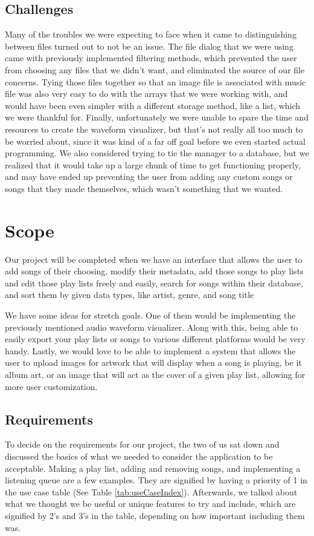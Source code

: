\documentclass[10pt,conference,onecolumn,compsoc]{IEEEtran}
\begin{document}
\subsection{Challenges}
Many of the troubles we were expecting to face when it came to distinguishing between files turned out to not be an issue. The file dialog that we were using came with previously implemented filtering methods, which prevented the user from choosing any files that we didn't want, and eliminated the source of our file concerns. Tying those files together so that an image file is associated with music file was also very easy to do with the arrays that we were working with, and would have been even simpler with a different storage method, like a list, which we were thankful for. Finally, unfortunately we were unable to spare the time and resources to create the waveform visualizer, but that's not really all too much to be worried about, since it was kind of a far off goal before we even started actual programming. We also considered trying to tie the manager to a database, but we realized that it would take up a large chunk of time to get functioning properly, and may have ended up preventing the user from adding any custom songs or songs that they made themselves, which wasn't something that we wanted.


\section{Scope}
Our project will be completed when we have an interface that allows the user to add songs of their choosing, modify their metadata, add those songs to play lists and edit those play lists freely and easily, search for songs within their database, and sort them by given data types, like artist, genre, and song title

We have some ideas for stretch goals. One of them would be implementing the previously mentioned audio waveform visualizer. Along with this, being able to easily export your play lists or songs to various different platforms would be very handy. Lastly, we would love to be able to implement a system that allows the user to upload images for artwork that will display when a song is playing, be it album art, or an image that will act as the cover of a given play list, allowing for more user customization.

\subsection{Requirements}
To decide on the requirements for our project, the two of us sat down and discussed the basics of what we needed to consider the application to be acceptable. Making a play list, adding and removing songs, and implementing a listening queue are a few examples. They are signified by having a priority of 1 in the use case table (See Table \ref{tab:useCaseIndex}). Afterwards, we talked about what we thought we be useful or unique features to try and include, which are signified by 2's and 3's in the table, depending on how important including them was.
\end{document}
